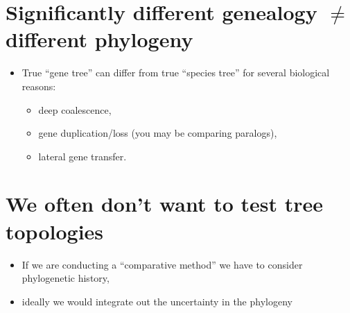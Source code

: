 
\myNewSlide
\section*{Significantly different genealogy $\neq$ different phylogeny}
\begin{itemize}
    \item True ``gene tree'' can differ from true ``species tree'' for several biological reasons:
    \begin{itemize}
        \item deep coalescence,
        \item gene duplication/loss (you may be comparing paralogs),
        \item lateral gene transfer.
    \end{itemize}
\end{itemize}

% 

\myNewSlide
\section*{We often don't want to test tree topologies}
\begin{itemize}
    \item If we are conducting a ``comparative method'' we have to consider phylogenetic history,
    \item ideally we would integrate out the uncertainty in the phylogeny
\end{itemize}
